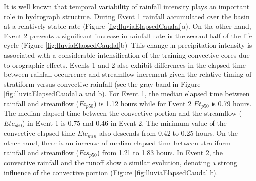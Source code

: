 \documentclass[hess, manuscript]{copernicus} %
\providecommand{\DIFadd}[1]{{\protect\color{blue}\uwave{#1}}} %
\providecommand{\DIFaddbegin}{} %
\providecommand{\DIFaddend}{} %
\begin{document}
It is well known that \DIFaddbegin \DIFadd{the }\DIFaddend temporal variability of rainfall intensity plays an important role in \DIFaddbegin \DIFadd{the  }\DIFaddend hydrograph structure. During Event 1 rainfall accumulated over the basin at a relatively stable rate (Figure \ref{fig:lluviaElapsedCaudal}a).  On the other hand, Event 2 presents a significant increase in rainfall rate in the second half of the life cycle (Figure \ref{fig:lluviaElapsedCaudal}b).  This change in precipitation intensity is associated with a considerable intensification of the training convective cores due to orographic effects. Events 1 and 2 also exhibit differences in the elapsed time between rainfall occurrence and streamflow increment given the relative timing of stratiform versus convective rainfall (see the gray band in Figure \ref{fig:lluviaElapsedCaudal}a and b).  For Event 1, the median elapsed time between rainfall and streamflow ($Et_{p50}$) is 1.12 hours while for Event 2 $Et_{p50}$ is 0.79 hours.  The median elapsed time between the convective portion and the streamflow ($Etc_{p50}$) in Event 1 is 0.75 and 0.46 in Event 2. The minimum value of the convective elapsed time $Etc_{min}$ also descends from 0.42 to 0.25 hours.  On the other hand, there is an increase of median elapsed time between stratiform rainfall and streamflow ($Ets_{p50}$) from 1.21 to 1.83 hours.  In Event 2, the convective rainfall and the runoff show a similar evolution,  denoting a strong influence of the convective portion (Figure \ref{fig:lluviaElapsedCaudal}b).\\
\end{document}
